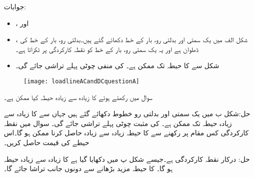 جوابات:
\begin{itemize}
\item
{}،  اور 
\item
{}، شکل  الف میں یک سمتی اور بدلتی رو، بار کے خط دکھائے گئے ہیں۔بدلتی رو، بار کے خط کی ڈھلوان  ہے اور یہ یک سمتی رو، بار کے خط کو نقطہ کارکردگی پر ٹکراتا ہے۔
\item
شکل سے   کا حیطہ  تک ممکن ہے۔ کی منفی چوٹی پہلے تراشی جائے گی۔
\end{itemize}
%
\begin{figure}
\centering
\texttt{[image: loadlineACandDCquestionA]}
\caption{}
\label{شکل_سوال_ٹرانزسٹر_یکسمتی_بدلتی_بار_خط_الف}
\end{figure}

سوال  میں  رکھتے ہوئے  کا زیادہ سے زیادہ حیطہ کیا ممکن ہے۔

حل:شکل  ب میں یک سمتی اور بدلتی رو خطوط دکھائے گئے ہیں جہاں سے  کا زیادہ سے زیادہ حیطہ  تک ممکن ہے۔ کی مثبت چوٹی پہلے تراشی جائے گی۔
سوال  میں نقطہ کارکردگی کس مقام پر رکھنے سے  کا حیطہ زیادہ سے زیادہ حاصل کرنا ممکن ہو گا۔اس حیطے کی قیمت حاصل کریں۔

حل: درکار نقطہ کارکردگی ہے۔جیسے شکل  پ میں دکھایا گیا ہے  کا زیادہ سے زیادہ حیطہ  ہو گا۔ کا حیطہ مزید بڑھانے سے دونوں جانب تراشا جائے گا۔


